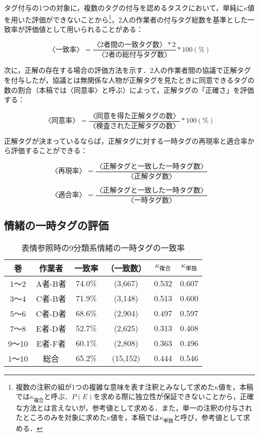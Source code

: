 \documentclass[japanese]{jnlp_1.3c}
\begin{document}
タグ付与の1つの対象に，複数のタグの付与を認めるタスクにおいて，単純に$\kappa$値を用いた評価ができないことから\footnote{複数の注釈の組が1つの複雑な意味を表す注釈とみなして求めた$\kappa$値を，本稿では$\kappa_{\mbox{複合}}$と呼ぶ．$P(E)$を求める際に独立性が保証できないことから，正確な方法とは言えないが，参考値として求める．また，単一の注釈の付与されたところのみを対象に求めた$\kappa$値を，本稿では$\kappa_{\mbox{単独}}$と呼び，参考値として求める．}，2人の作業者の付与タグ総数を基準とした一致率が評価値として用いられることがある\cite{徳久R&寺嶌06}：

\[\mbox{〈一致率〉}= \frac{\mbox{〈2者間の一致タグ数〉} * 2}{\mbox{〈2者の総付与タグ数〉}} * 100 (\%) \]

次に，正解の存在する場合の評価方法を示す．2人の作業者間の協議で正解タグを付与したが，協議とは無関係な人物が正解タグを見たときに同意できるタグの数の割合（本稿では〈同意率〉と呼ぶ）によって，正解タグの「正確さ」を評価する：

\[\mbox{〈同意率〉} = \frac{\mbox{〈同意を得た正解タグの数〉}}{\mbox{〈検査された正解タグの数〉}} * 100 (\%) \]

正解タグが決まっているならば，正解タグに対する一時タグの再現率と適合率から評価することができる：

\[ \mbox{〈再現率〉} = \frac{\mbox{〈正解タグと一致した一時タグ数〉}}{\mbox{〈正解タグ数〉}} \]

\[ \mbox{〈適合率〉} = \frac{\mbox{〈正解タグと一致した一時タグ数〉}}{\mbox{〈一時タグ数〉}} \]


\subsection{情緒の一時タグの評価} \label{sec4.2}

\begin{table}[b]
\begin{center}
\caption{表情参照時の9分類系情緒の一時タグの一致率} \label{tab3}
\begin{tabular}{cccccc}
\hline \hline
巻     & 作業者   & 一致率 &（一致数）&$\kappa_{\mbox{複合}}$ &$\kappa_{\mbox{単独}}$ \\
\hline
1〜2   & A者-B者  & 74.0\% & (3,667) & 0.532  & 0.607 \\
3〜4   & C者-B者  & 71.9\% & (3,148) & 0.513  & 0.600 \\
5〜6   & C者-D者  & 68.6\% & (2,904) & 0.497  & 0.597 \\
7〜8   & E者-D者  & 52.7\% & (2,625) & 0.313  & 0.408 \\
9〜10  & E者-F者  & 60.1\% & (2,808) & 0.363  & 0.496 \\
\hline
1〜10  & 総合     & 65.2\% &(15,152) & 0.444  & 0.546 \\
\hline
\end{tabular}
\end{center}
\end{table}
\end{document}
